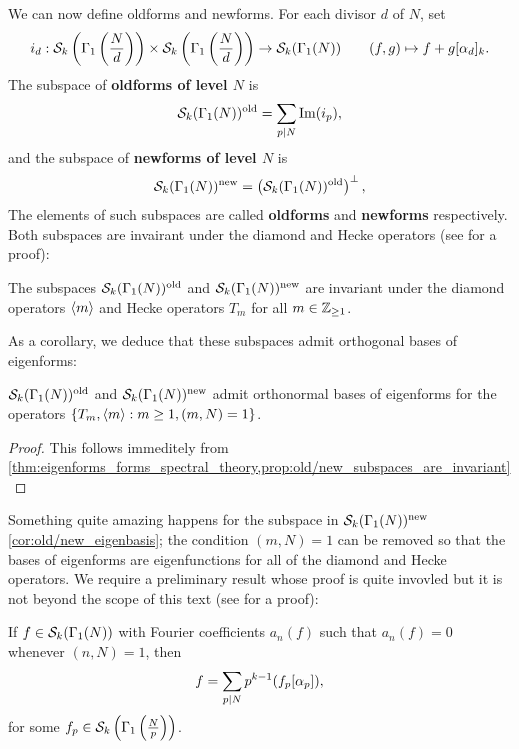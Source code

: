       We can now define oldforms and newforms. For each divisor $d$ of $N$, set
      \[
        i_{d}:\mathcal{S}_{k}\left(\Gamma_{1}\left(\frac{N}{d}\right)\right)\times\mathcal{S}_{k}\left(\Gamma_{1}\left(\frac{N}{d}\right)\right) \to \mathcal{S}_{k}(\Gamma_{1}(N)) \qquad (f,g) \mapsto f+g[\alpha_{d}]_{k}.
      \]
      The subspace of \textbf{oldforms of level $N$} is
      \[
        \mathcal{S}_{k}(\Gamma_{1}(N))^{\mathrm{old}} = \sum_{p \mid N}\mathrm{Im}(i_{p}),
      \]
      and the subspace of \textbf{newforms of level $N$} is
      \[
        \mathcal{S}_{k}(\Gamma_{1}(N))^{\mathrm{new}} = \left(\mathcal{S}_{k}(\Gamma_{1}(N))^{\mathrm{old}} \right)^{\perp},
      \]
      The elements of such subspaces are called \textbf{oldforms} and \textbf{newforms} respectively. Both subspaces are invairant under the diamond and Hecke operators (see \cite{diamond2005first} for a proof):

      \begin{proposition}\label{prop:old/new_subspaces_are_invariant}
        The subspaces $\mathcal{S}_{k}(\Gamma_{1}(N))^{\mathrm{old}}$ and $\mathcal{S}_{k}(\Gamma_{1}(N))^{\mathrm{new}}$ are invariant under the diamond operators $\langle m\rangle$ and Hecke operators $T_{m}$ for all $m \in \mathbb{Z}_{\ge 1}$.
      \end{proposition}

      As a corollary, we deduce that these subspaces admit orthogonal bases of eigenforms:

      \begin{corollary}\label{cor:old/new_eigenbasis}
        $\mathcal{S}_{k}(\Gamma_{1}(N))^{\mathrm{old}}$ and $\mathcal{S}_{k}(\Gamma_{1}(N))^{\mathrm{new}}$ admit orthonormal bases of eigenforms for the operators $\{T_{m},\langle m\rangle:m \ge 1, (m,N) = 1\}$.
      \end{corollary}
      \begin{proof}
        This follows immeditely from \cref{thm:eigenforms_forms_spectral_theory,prop:old/new_subspaces_are_invariant}
      \end{proof}

      Something quite amazing happens for the subspace in $\mathcal{S}_{k}(\Gamma_{1}(N))^{\mathrm{new}}$ \cref{cor:old/new_eigenbasis}; the condition $(m,N) = 1$ can be removed so that the bases of eigenforms are eigenfunctions for all of the diamond and Hecke operators. We require a preliminary result whose proof is quite invovled but it is not beyond the scope of this text (see \cite{diamond2005first} for a proof):

      \begin{lemma}\label{lem:the_main_lemma_for_newforms}
        If $f \in \mathcal{S}_{k}(\Gamma_{1}(N))$ with Fourier coefficients $a_{n}(f)$ such that $a_{n}(f) = 0$ whenever $(n,N) = 1$, then
        \[
          f = \sum_{p \mid N}p^{k-1}(f_{p}[\alpha_{p}]),
        \]
        for some $f_{p} \in \mathcal{S}_{k}\left(\Gamma_{1}\left(\frac{N}{p}\right)\right)$.
      \end{lemma}

